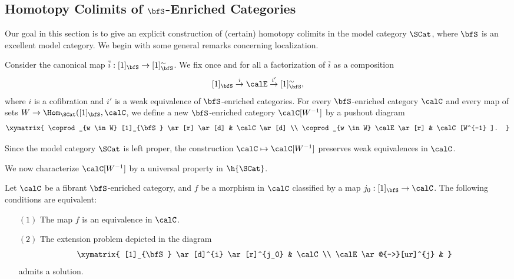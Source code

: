 \subsection{Homotopy Colimits of $\bfS$-Enriched Categories}\label{hoco}

Our goal in this section is to give an explicit construction of (certain) homotopy colimits
in the model category $\SCat$, where $\bfS$ is an excellent model category. We begin
with some general remarks concerning localization.

\begin{notation}\label{localdef}
Consider the canonical map $\overline{i}: [1]_{\bfS} \rightarrow [1]^{\sim}_{\bfS}$. We
fix once and for all a factorization of $\overline{i}$ as a composition
$$ [1]_{\bfS} \stackrel{i}{\rightarrow} \calE \stackrel{i'}{\rightarrow} [1]_{\bfS}^{\sim},$$
where $i$ is a cofibration and $i'$ is a weak equivalence of $\bfS$-enriched categories.
For every $\bfS$-enriched category $\calC$ and every map of sets
$W \rightarrow \Hom_{\SCat}( [1]_{\bfS}, \calC$, we define a new $\bfS$-enriched
category $\calC[W^{-1}]$ by a pushout diagram
$$ \xymatrix{ \coprod_{w \in W} [1]_{\bfS} \ar[r] \ar[d] & \calC \ar[d] \\
\coprod_{w \in W} \calE \ar[r] & \calC[W^{-1} ]. }$$
\end{notation}

\begin{remark}\label{summat}
Since the model category $\SCat$ is left proper, the construction
$\calC \mapsto \calC[W^{-1}]$ preserves weak equivalences in $\calC$.
\end{remark}

We now characterize $\calC[W^{-1}]$ by a universal property in $\h{\SCat}$.

\begin{lemma}\label{pufft}
Let $\calC$ be a fibrant $\bfS$-enriched category, and 
$f$ be a morphism in $\calC$ classified by a map $j_0: [1]_{\bfS} \rightarrow \calC$.
The following conditions are equivalent:
\begin{itemize}
\item[$(1)$] The map $f$ is an equivalence in $\calC$.
\item[$(2)$] The extension problem depicted in the diagram
$$ \xymatrix{ [1]_{\bfS} \ar[d]^{i} \ar[r]^{j_0} & \calC \\
\calE \ar@{-->}[ur]^{j} & }$$
admits a solution.
\end{itemize}
\end{lemma}

